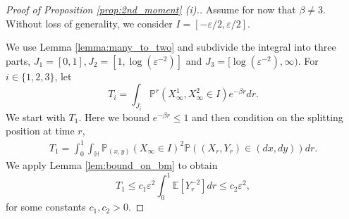 \documentclass[10pt,a4paper]{amsart}
\newcommand*{\EE}{\ensuremath{\mathbb{E}}}	        	%
\newcommand*{\HH}{\ensuremath{\mathbb{H}}}	        	%
\newcommand*{\PP}{\ensuremath{\mathbb{P}}}	        	%
\newcommand*{\eps}{\ensuremath{\varepsilon}}            %
\begin{document}
\begin{proof}[Proof of Proposition \ref{prop:2nd_moment} (i).] Assume for now that $\beta\neq 3$.
    Without loss of generality, we consider $I=[-\eps/2,\eps/2]$. 
    
    We use Lemma \ref{lemma:many_to_two} and subdivide the integral into three parts, $J_1=[0,1],J_2=[1,\log(\eps^{-2})]$ and $J_3=[\log(\eps^{-2}), \infty)$. For $i\in \{1,2,3\}$, let
\begin{equation*}
    T_i = \int_{J_i} \PP^r\left(X^1_\infty,X_\infty^2\in I\right) e^{-\beta r}dr.
\end{equation*}
We start with $T_1$. Here we bound $e^{-\beta r} \leq 1$ and then condition on the splitting position at time $r$,
\begin{align*}
    T_1 = \int_0^1 \int_{\HH}  \PP_{(x,y)}\left(X_\infty \in I\right)^2 \PP\left((X_r,Y_r) \in (dx,dy)\right) dr.
\end{align*}
We apply Lemma \ref{lem:bound_on_bm} {to obtain}
\begin{equation}\label{eq:T1}
    T_1 \leq c_1 \eps^2\int_0^1 \EE\left[Y_r^{-2}\right]dr \leq c_2 \eps^2,
\end{equation}
for some {constants} $c_1,c_2>0$. 


\end{proof}
\end{document}
